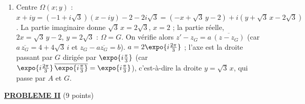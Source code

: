 \begin{description}
\begin{enumerate}
\begin{enumerate}
				\par\noindent{}
			\item {}
				Centre $\Omega(x;y)$ : $x + iy = (-1 + i\sqrt{3})(x - iy) - 2 - 2i\sqrt{3} = (-x + \sqrt{3}\,y - 2) + i(y + \sqrt{3}\,x - 2\sqrt{3})$.
				La partie imaginaire donne $\sqrt{3}\,x = 2\sqrt{3}$, $x = 2$ ; la partie réelle, $2x = \sqrt{3}\,y - 2$, $y = 2\sqrt{3}$ : $\Omega = G$.
				On vérifie alors $z' - z_G = a\,\overline{(z - z_G)}$ (car $a\,\overline{z_G} = 4 + 4\sqrt{3}\,i$ et $z_G - a\overline{z_G} = b$).
				$a = 2\expo{i\frac{2\pi}{3}}$ ; l'axe est la droite passant par $G$ dirigée par $\expo{i\frac{\pi}{3}}$ (car $\expo{i\frac{2\pi}{3}}\,\overline{\expo{i\frac{\pi}{3}}} = \expo{i\frac{\pi}{3}}$),
				c'est-à-dire la droite $y = \sqrt{3}\,x$, qui passe par $A$ et $G$.
				\par\noindent{}
		\end{enumerate}
	\end{enumerate}
\end{description}
\noindent \underline{\textsc{\textbf{PROBLEME II}}} (9 points)
